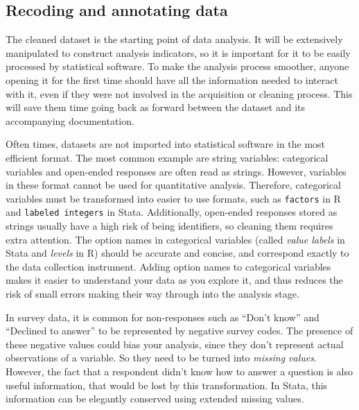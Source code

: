 \subsection{Recoding and annotating data}

The cleaned dataset is the starting point of data analysis.
It will be extensively manipulated to construct analysis indicators,
so it is important for it to be easily processed by statistical software.
To make the analysis process smoother, 
anyone opening it for the first time should have all the information needed to interact with it,
even if they were not involved in the acquisition or cleaning process.
This will save them time going back as forward between the dataset and its accompanying documentation. 

Often times, datasets are not imported into statistical software in the most efficient format.
The most common example are string variables:
categorical variables and open-ended responses are often read as strings.
However, variables in these format cannot be used for quantitative analysis.
Therefore, categorical variables must be transformed into easier to use formats,
such as \texttt{factors} in R and \texttt{labeled integers} in Stata.
Additionally, open-ended responses stored as strings usually have a high risk of being identifiers, 
so cleaning them requires extra attention.
The option names in categorical variables
(called \textit{value labels} in Stata and \textit{levels} in R)
should be accurate and concise, 
and correspond exactly to the data collection instrument.
Adding option names to categorical variables 
makes it easier to understand your data as you explore it,
and thus reduces the risk of small errors making their way through into the analysis stage.

In survey data, it is common for non-responses such as ``Don't know'' and ``Declined to answer''
to be represented by negative survey codes. 
The presence of these negative values could bias your analysis,
since they don't represent actual observations of a variable.
So they need to be turned into \textit{missing values}.
However, the fact that a respondent didn't know how to answer a question is also useful information,
that would be lost by this transformation.
In Stata, this information can be elegantly conserved using extended missing values.


